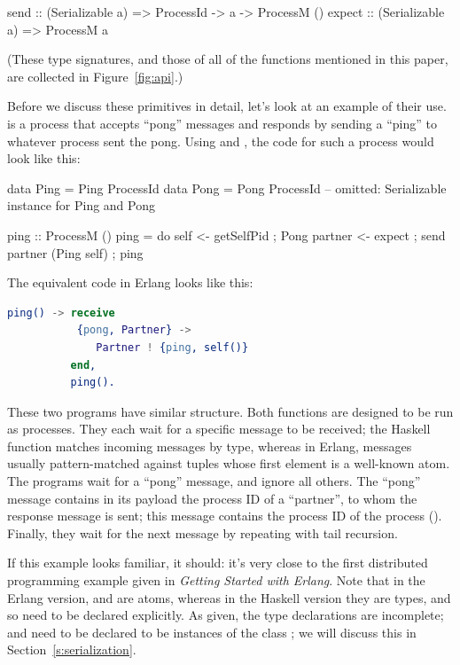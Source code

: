 \documentclass[preprint]{sigplanconf}
\begin{document}
\par{\small
\begin{code}
send :: (Serializable a) => ProcessId -> a 
						-> ProcessM ()
expect :: (Serializable a) => ProcessM a
\end{code}}
\noindent
(These type signatures, and those of all of the functions mentioned in this paper, are collected in Figure~\ref{fig:api}.)

Before we discuss these primitives in detail, let's look at an example of their use.
 is a process that accepts ``pong'' messages and responds by sending a ``ping'' to whatever process sent the pong. Using  and , the code for such a process would look like this:

\begin{code}
data Ping = Ping ProcessId
data Pong = Pong ProcessId
-- omitted: Serializable instance for Ping and Pong

ping :: ProcessM ()
ping = do { self <- getSelfPid
          ; Pong partner <- expect
          ; send partner (Ping self)
          ; ping }
\end{code}

\noindent The equivalent code in Erlang looks like this:

\begin{lstlisting}[language=Erlang]
ping() -> receive
           {pong, Partner} -> 
              Partner ! {ping, self()}
          end,
          ping().               
\end{lstlisting}

These two programs have similar structure. Both  functions are designed to be run as processes. They each wait for a specific message to be received; the Haskell  function matches incoming messages by type, whereas in Erlang, messages usually pattern-matched against tuples whose first element is a well-known atom. The programs wait for a ``pong'' message, and ignore all others. The ``pong'' message contains in its payload the process ID of a ``partner'', to whom the response message is sent; this message contains the process ID of the  process (). Finally, they wait for the next message by repeating with tail recursion.

If this example looks familiar, it should: it's very close to the first distributed programming example given in {\em Getting Started with Erlang}\cite{GSWE}. Note that in the Erlang version,  and  are atoms, whereas in the Haskell version they are types, and so need to be declared explicitly. 
As given, the type declarations are incomplete;  and  need to be declared to be instances of the class ; we will discuss this in Section~\ref{s:serialization}.
\end{document}
